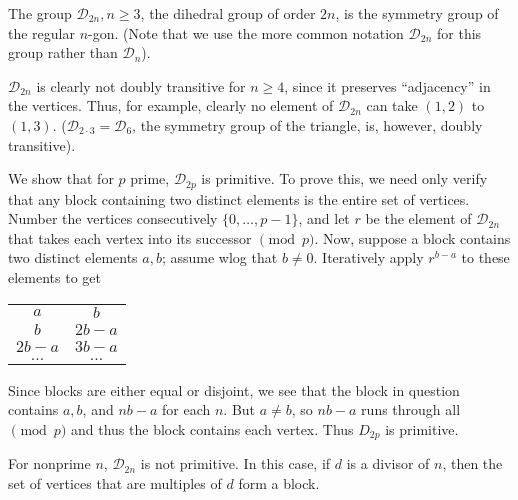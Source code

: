 \documentclass[12pt]{article}
\newcommand{\cD}{\mathcal{D}}
\begin{document}
The group $\cD_{2n}, n\geq 3$, the dihedral group of order $2n$, is the symmetry group of the regular $n$-gon. (Note that we use the more common notation $\cD_{2n}$ for this group rather than $\cD_n$).

$\cD_{2n}$ is clearly not doubly transitive for $n\geq 4$, since it preserves ``adjacency'' in the vertices. Thus, for example, clearly no element of $\cD_{2n}$ can take $(1,2)$ to $(1,3)$. ($\cD_{2\cdot 3}=\cD_6$, the symmetry group of the triangle, is, however, doubly transitive).

We show that for $p$ prime, $\cD_{2p}$ is primitive. To prove this, we need only verify that any block containing two distinct elements is the entire set of vertices. Number the vertices consecutively  $\{0,\ldots,p-1\}$, and let $r$ be the element of $\cD_{2n}$ that takes each vertex into its successor $\pmod p$. Now, suppose a block contains two distinct elements $a,b$; assume wlog that $b\neq 0$. Iteratively apply $\displaystyle r^{b-a}$ to these elements to get
\begin{center}
\begin{tabular}{c c}
$a$&$b$\\
$b$&$2b-a$\\
$2b-a$&$3b-a$\\
$\ldots$&$\ldots$
\end{tabular}
\end{center}
Since blocks are either equal or disjoint, we see that the block in question contains $a,b$, and $nb-a$ for each $n$. But $a\neq b$, so $nb-a$ runs through all  $\pmod p$ and thus the block contains each vertex. Thus $D_{2p}$ is primitive.

For nonprime $n$, $\cD_{2n}$ is not primitive. In this case, if $d$ is a divisor of $n$, then the set of vertices that are multiples of $d$ form a block.

\end{document}
